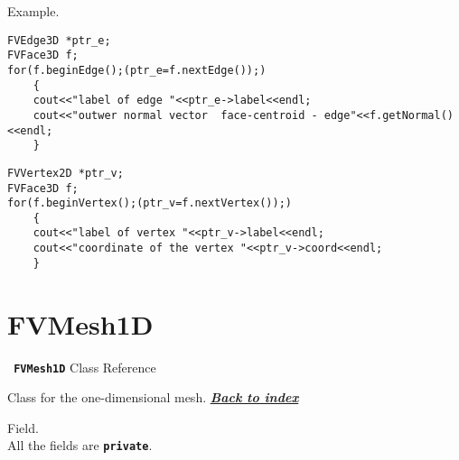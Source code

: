 \documentclass[12pt]{book}
\newcommand{\Index}[0]{{\bf \sl{\color{DodgerBlue} Back to index}}}
\newcommand{\Class}[1]{{\bf \tt{\color{magenta} #1}}}
\begin{document}
{\headline Example.}
\begin{lstlisting}[frame=TB,framerule=0.3pt,caption=Loop over the edges of a 3D face]
FVEdge3D *ptr_e;
FVFace3D f;
for(f.beginEdge();(ptr_e=f.nextEdge());)
    {
    cout<<"label of edge "<<ptr_e->label<<endl;
    cout<<"outwer normal vector  face-centroid - edge"<<f.getNormal()<<endl;
    }
\end{lstlisting}
\begin{lstlisting}[frame=TB,framerule=0.3pt,caption=Loop over the vertices of a 3D face]
FVVertex2D *ptr_v;
FVFace3D f;
for(f.beginVertex();(ptr_v=f.nextVertex());)
    {
    cout<<"label of vertex "<<ptr_v->label<<endl;
    cout<<"coordinate of the vertex "<<ptr_v->coord<<endl;
    }
\end{lstlisting}
\newpage

%
%
\section{FVMesh1D}\label{FVMesh1D}
\centerline{\Class{FVMesh1D} Class Reference}
\begin{Description*}
Class for the one-dimensional mesh.
\hfill \hyperref[MainIndex]{\Index}
\end{Description*}

{\headline Field.}\\[5pt]
All the fields are {\bf \tt private}.
\end{document}

